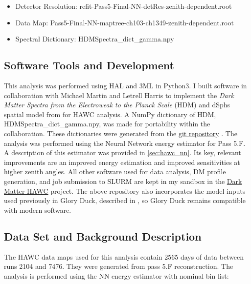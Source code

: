 \begin{itemize}
    \item Detector Resolution: refit-Pass5-Final-NN-detRes-zenith-dependent.root
    \item Data Map: Pass5-Final-NN-maptree-ch103-ch1349-zenith-dependent.root
    \item Spectral Dictionary: HDMSpectra\_dict\_gamma.npy
\end{itemize}

\subsection{Software Tools and Development}\label{sec:mtd_tools}

This analysis was performed using HAL and 3ML \cite{Abeysekara_2017, vianello2015multimission} in Python3.
I built software in collaboration with Michael Martin and Letrell Harris to implement the \emph{Dark Matter Spectra from the Electroweak to the Planck Scale} (HDM) \cite{Rodd:HDM_spec} and dSphs spatial model from \cite{DM_Strigari20} for HAWC analysis.
A NumPy dictionary of HDM, HDMSpectra\_dict\_gamma.npy, was made for portability within the collaboration.
These dictionaries were generated from the \href{https://github.com/nickrodd/HDMSpectra/tree/master}{git repository} \cite{Rodd:HDM_spec}.
The analysis was performed using the Neural Network energy estimator for Pass 5.F.
A description of this estimator was provided in \cref{sec:hawc_nn}. Its key, relevant improvements are an improved energy estimation and improved sensitivities at higher zenith angles.
All other software used for data analysis, DM profile generation, and job submission to SLURM are kept in my sandbox in the \href{https://gitlab.com/hawc-observatory/sandboxes/salaza82/dark_matter_hawc}{Dark Matter HAWC} project.
The above repository also incorporates the model inputs used previously in Glory Duck, described in , so Glory Duck remains compatible with modern software.

\subsection{Data Set and Background Description} \label{sec:mtd_data_bkgd}

The HAWC data maps used for this analysis contain 2565 days of data between runs 2104 and 7476.
They were generated from pass 5.F reconstruction.
The analysis is performed using the NN energy estimator with nominal bin list:

